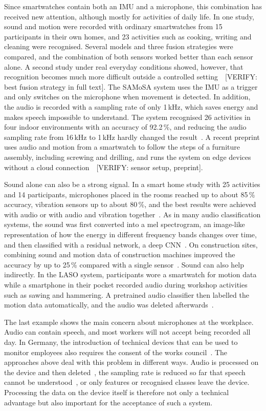 Since smartwatches contain both an IMU and a microphone, this combination has
received new attention, although mostly for activities of daily life. In one
study, sound and motion were recorded with ordinary smartwatches from 15
participants in their own homes, and 23 activities such as cooking, writing and
cleaning were recognised. Several models and three fusion strategies were
compared, and the combination of both sensors worked better than each sensor
alone. A second study under real everyday conditions showed,
however, that recognition becomes much more difficult outside a controlled
setting~\cite{bhattacharya2022leveraging}~[VERIFY: best fusion strategy in full
text]. The SAMoSA system uses the IMU as a trigger and only
switches on the microphone when movement is detected. In addition, the audio is
recorded with a sampling rate of only 1\,kHz, which saves energy and makes
speech impossible to understand. The system recognised 26 activities in four
indoor environments with an accuracy of 92.2\,\%, and reducing the audio
sampling rate from 16\,kHz to 1\,kHz hardly changed the
result~\cite{mollyn2022samosa}. A recent preprint uses audio and motion from a
smartwatch to follow the steps of a furniture assembly, including screwing and
drilling, and runs the system on edge devices without a cloud
connection~\cite{mahfuz2026proactive}~[VERIFY: sensor setup, preprint].

Sound alone can also be a strong signal. In a smart home study with 25
activities and 14 participants, microphones placed in the rooms reached up to
about 85\,\% accuracy, vibration sensors up to about 80\,\%, and the best
results were achieved with audio or with audio and vibration
together~\cite{koch2024recognition}. As in many audio classification systems,
the sound was first converted into a mel spectrogram, an image-like
representation of how the energy in different frequency bands changes over
time, and then classified with a residual network, a deep
CNN~\cite{koch2024recognition}. On construction sites, combining sound and
motion data of construction machines improved the accuracy by up to 25\,\%
compared with a single sensor~\cite{sherafat2019construction}. Sound can also
help indirectly. In the LASO system, participants wore a smartwatch for motion
data while a smartphone in their pocket recorded audio during workshop
activities such as sawing and hammering. A pretrained audio classifier then
labelled the motion data automatically, and the audio was deleted
afterwards~\cite{chatterjee2020laso}.

The last example shows the main concern about microphones at the workplace.
Audio can contain speech, and most workers will not accept being recorded all
day. In Germany, the introduction of technical devices that can be used to
monitor employees also requires the consent of the works council~\cite{betrvg}. The approaches above deal with this
problem in different ways. Audio is processed on the device and then
deleted~\cite{chatterjee2020laso}, the sampling rate is reduced so far that
speech cannot be understood~\cite{mollyn2022samosa}, or only features or
recognised classes leave the device. Processing the data on the device itself
is therefore not only a technical advantage but also important for the
acceptance of such a system.

